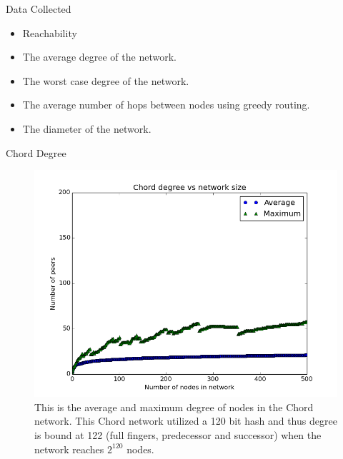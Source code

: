 \documentclass[11pt]{beamer}
\begin{document}
\begin{frame}{Data Collected}
	\begin{itemize}
		\item Reachability
		\item The average degree of the network. 
		\item The worst case degree of the network.
		\item The average number of hops between nodes using greedy routing.
		\item The diameter of the network.  
		
	\end{itemize}
\end{frame}


\begin{frame}{Chord Degree}
\begin{figure}
	\centering
	\includegraphics[width=0.7\linewidth]{figs/ChordDegree}
	\caption[Degree of nodes in Chord]{This is the average and maximum degree of nodes in the Chord network. This Chord network utilized a 120 bit hash and thus degree is bound at 122 (full fingers, predecessor and successor) when the network reaches $2^{120}$ nodes.}
	\label{fig:ChordDegree}
\end{figure}

\end{frame}
\end{document}
